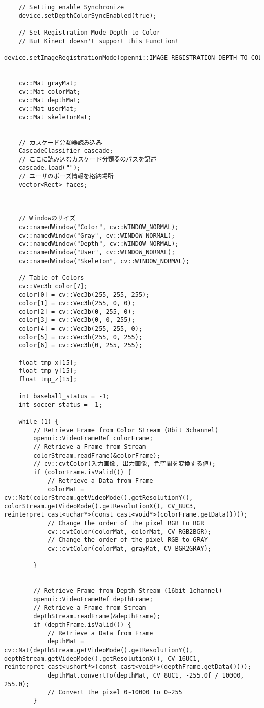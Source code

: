 \begin{lstlisting}
	// Setting enable Synchronize
	device.setDepthColorSyncEnabled(true);

	// Set Registration Mode Depth to Color
	// But Kinect doesn't support this Function!
	device.setImageRegistrationMode(openni::IMAGE_REGISTRATION_DEPTH_TO_COLOR);


	cv::Mat grayMat;
	cv::Mat colorMat;
	cv::Mat depthMat;
	cv::Mat userMat;
	cv::Mat skeletonMat;


	// カスケード分類器読み込み
	CascadeClassifier cascade;
	// ここに読み込むカスケード分類器のパスを記述
	cascade.load("");
	// ユーザのポーズ情報を格納場所
	vector<Rect> faces;



	// Windowのサイズ
	cv::namedWindow("Color", cv::WINDOW_NORMAL);
	cv::namedWindow("Gray", cv::WINDOW_NORMAL);
	cv::namedWindow("Depth", cv::WINDOW_NORMAL);
	cv::namedWindow("User", cv::WINDOW_NORMAL);
	cv::namedWindow("Skeleton", cv::WINDOW_NORMAL);

	// Table of Colors
	cv::Vec3b color[7];
	color[0] = cv::Vec3b(255, 255, 255);
	color[1] = cv::Vec3b(255, 0, 0);
	color[2] = cv::Vec3b(0, 255, 0);
	color[3] = cv::Vec3b(0, 0, 255);
	color[4] = cv::Vec3b(255, 255, 0);
	color[5] = cv::Vec3b(255, 0, 255);
	color[6] = cv::Vec3b(0, 255, 255);

	float tmp_x[15];
	float tmp_y[15];
	float tmp_z[15];

	int baseball_status = -1;
	int soccer_status = -1;

	while (1) {
		// Retrieve Frame from Color Stream (8bit 3channel)
		openni::VideoFrameRef colorFrame;
		// Retrieve a Frame from Stream
		colorStream.readFrame(&colorFrame);
		// cv::cvtColor(入力画像, 出力画像, 色空間を変換する値);
		if (colorFrame.isValid()) {
			// Retrieve a Data from Frame 
			colorMat = cv::Mat(colorStream.getVideoMode().getResolutionY(), colorStream.getVideoMode().getResolutionX(), CV_8UC3, reinterpret_cast<uchar*>(const_cast<void*>(colorFrame.getData()))); 
			// Change the order of the pixel RGB to BGR 
			cv::cvtColor(colorMat, colorMat, CV_RGB2BGR); 
			// Change the order of the pixel RGB to GRAY
			cv::cvtColor(colorMat, grayMat, CV_BGR2GRAY); 

		}


		// Retrieve Frame from Depth Stream (16bit 1channel)
		openni::VideoFrameRef depthFrame;
		// Retrieve a Frame from Stream
		depthStream.readFrame(&depthFrame); 
		if (depthFrame.isValid()) {
			// Retrieve a Data from Frame
			depthMat = cv::Mat(depthStream.getVideoMode().getResolutionY(), depthStream.getVideoMode().getResolutionX(), CV_16UC1, reinterpret_cast<ushort*>(const_cast<void*>(depthFrame.getData()))); 
			depthMat.convertTo(depthMat, CV_8UC1, -255.0f / 10000, 255.0);
			// Convert the pixel 0~10000 to 0~255
		}


\end{lstlisting}
